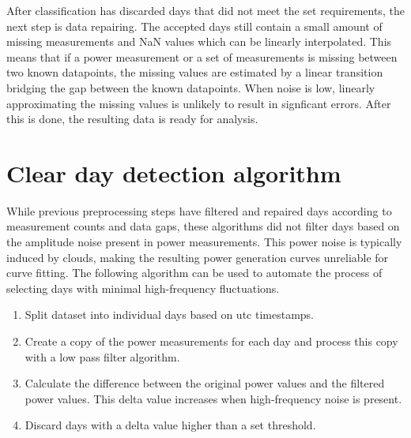 \noindent After classification has discarded days that did not meet the set requirements, the next step is data repairing. The accepted days still contain a small amount of missing measurements and NaN values which can be linearly interpolated. This means that if a power measurement or a set of measurements is missing between two known datapoints, the missing values are estimated by a linear transition bridging the gap between the known datapoints. When noise is low, linearly approximating the missing values is unlikely to result in signficant errors. After this is done, the resulting data is ready for analysis.



\section{Clear day detection algorithm}
\label{clearskyalgo_chapter}
While previous preprocessing steps have filtered and repaired days according to measurement counts and data gaps, these algorithms did not filter days based on the amplitude noise present in power measurements. This power noise is typically induced by clouds, making the resulting power generation curves unreliable for curve fitting. The following algorithm can be used to automate the process of selecting days with minimal high-frequency fluctuations.






\begin{enumerate}
  \item Split dataset into individual days based on utc timestamps.
  
  \item Create a copy of the power measurements for each day and process this copy with a low pass filter algorithm.

  
  \item Calculate the difference between the original power values and the filtered power values. This delta value increases when high-frequency noise is present.
  
  
  \item Discard days with a delta value higher than a set threshold.
  

\end{enumerate}



